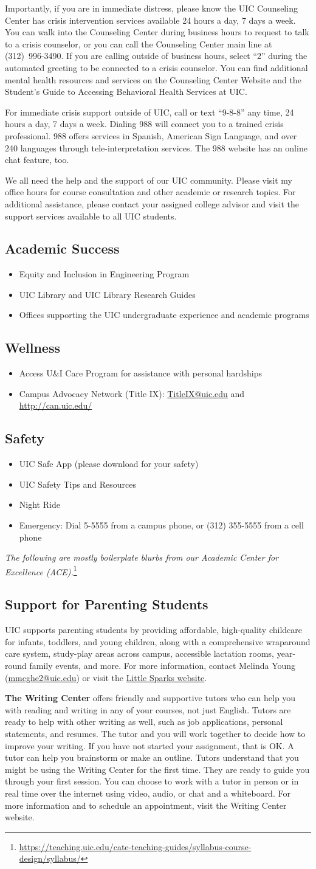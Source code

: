\documentclass[11pt]{article}
\makeatletter
\newcommand{\resourcesSection}{%
We all need the help and the support of our UIC community. Please visit my office hours for course consultation and other academic or research topics.
For additional assistance, please contact your assigned college advisor and visit the support services available to all UIC students.

\subsection*{Academic Success}
\begin{itemize}
  \item Equity and Inclusion in Engineering Program
  \item UIC Library and UIC Library Research Guides
  \item Offices supporting the UIC undergraduate experience and academic programs
\end{itemize}

\subsection*{Wellness}
\begin{itemize}
  \item Access U\&I Care Program for assistance with personal hardships
  \item Campus Advocacy Network (Title IX): \href{mailto:TitleIX@uic.edu}{TitleIX@uic.edu} \quad and \quad \url{http://can.uic.edu/}
\end{itemize}

\subsection*{Safety}
\begin{itemize}
  \item UIC Safe App (please download for your safety)
  \item UIC Safety Tips and Resources
  \item Night Ride
  \item Emergency: Dial 5-5555 from a campus phone, or (312) 355-5555 from a cell phone
\end{itemize}
}
\makeatother
\begin{document}
Importantly, if you are in immediate distress, please know the UIC Counseling Center
has crisis intervention services available 24 hours a day, 7 days a week. You can walk
into the Counseling Center during business hours to request to talk to a crisis
counselor, or you can call the Counseling Center main line at (312)~996-3490. If you are
calling outside of business hours, select ``2'' during the automated greeting to be
connected to a crisis counselor. You can find additional mental health resources and
services on the Counseling Center Website and the Student's Guide to Accessing
Behavioral Health Services at UIC.

For immediate crisis support outside of UIC, call or text ``9-8-8'' any time, 24 hours a
day, 7 days a week. Dialing 988 will connect you to a trained crisis professional. 988
offers services in Spanish, American Sign Language, and over 240 languages through
tele-interpretation services. The 988 website has an online chat feature, too.

\resourcesSection

\textit{The following are mostly boilerplate blurbs from our Academic Center for Excellence
(ACE).}\footnote{\url{https://teaching.uic.edu/cate-teaching-guides/syllabus-course-design/syllabus/}}

\subsection*{Support for Parenting Students}

UIC supports parenting students by providing affordable, high-quality childcare for
infants, toddlers, and young children, along with a comprehensive wraparound care
system, study-play areas across campus, accessible lactation rooms, year-round
family events, and more. For more information, contact Melinda Young
(\href{mailto:mmcghe2@uic.edu}{mmcghe2@uic.edu}) or visit the \href{https://littlesparks.uic.edu}{Little Sparks website}.


\textbf{The Writing Center} offers friendly and supportive tutors who can help you with
reading and writing in any of your courses, not just English. Tutors are ready to help
with other writing as well, such as job applications, personal statements, and resumes.
The tutor and you will work together to decide how to improve your writing. If you have
not started your assignment, that is OK. A tutor can help you brainstorm or make an
outline. Tutors understand that you might be using the Writing Center for the first time.
They are ready to guide you through your first session. You can choose to work with a
tutor in person or in real time over the internet using video, audio, or chat and a
whiteboard. For more information and to schedule an appointment, visit the Writing
Center website.
\end{document}
